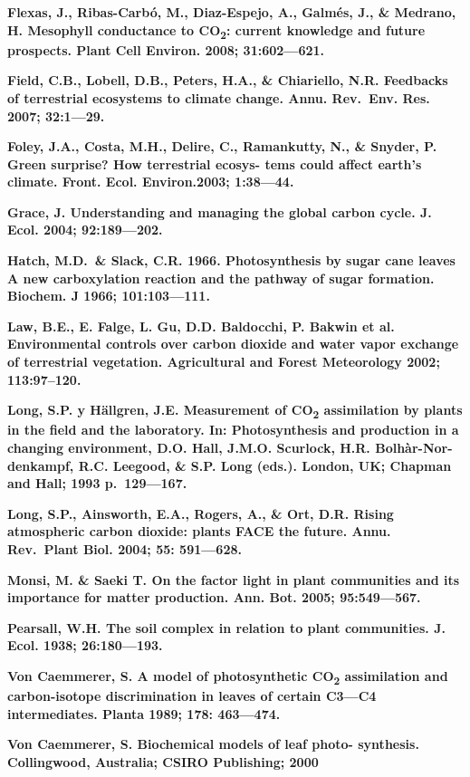 \documentclass[
]{article}
\begin{document}
\textbf{Flexas, J., Ribas-Carbó, M., Diaz-Espejo, A., Galmés, J., \&
Medrano, H. Mesophyll conductance to CO\textsubscript{2}: current
knowledge and future prospects. Plant Cell Environ. 2008; 31:602---621.}

\textbf{Field, C.B., Lobell, D.B., Peters, H.A., \& Chiariello, N.R.
Feedbacks of terrestrial ecosystems to climate change. Annu. Rev.~Env.
Res. 2007; 32:1---29.}

\textbf{Foley, J.A., Costa, M.H., Delire, C., Ramankutty, N., \& Snyder,
P. Green surprise? How terrestrial ecosys- tems could affect earth's
climate. Front. Ecol. Environ.2003; 1:38---44.}

\textbf{Grace, J. Understanding and managing the global carbon cycle. J.
Ecol. 2004; 92:189---202.}

\textbf{Hatch, M.D.~\& Slack, C.R. 1966. Photosynthesis by sugar cane
leaves A new carboxylation reaction and the pathway of sugar formation.
Biochem. J 1966; 101:103---111.}

\textbf{Law, B.E., E. Falge, L. Gu, D.D. Baldocchi, P. Bakwin et al.
Environmental controls over carbon dioxide and water vapor exchange of
terrestrial vegetation. Agricultural and Forest Meteorology 2002;
113:97--120.}

\textbf{Long, S.P. y Hällgren, J.E. Measurement of CO\textsubscript{2}
assimilation by plants in the field and the laboratory. In:
Photosynthesis and production in a changing environment, D.O. Hall,
J.M.O. Scurlock, H.R. Bolhàr-Nor- denkampf, R.C. Leegood, \& S.P. Long
(eds.). London, UK; Chapman and Hall; 1993 p.~129---167.}

\textbf{Long, S.P., Ainsworth, E.A., Rogers, A., \& Ort, D.R. Rising
atmospheric carbon dioxide: plants FACE the future. Annu. Rev.~Plant
Biol. 2004; 55: 591---628.}

\textbf{Monsi, M. \& Saeki T. On the factor light in plant communities
and its importance for matter production. Ann. Bot. 2005; 95:549---567.}

\textbf{Pearsall, W.H. The soil complex in relation to plant
communities. J. Ecol. 1938; 26:180---193.}

\textbf{Von Caemmerer, S. A model of photosynthetic CO\textsubscript{2}
assimilation and carbon-isotope discrimination in leaves of certain
C3---C4 intermediates. Planta 1989; 178: 463---474.}

\textbf{Von Caemmerer, S. Biochemical models of leaf photo- synthesis.
Collingwood, Australia; CSIRO Publishing; 2000}
\end{document}
